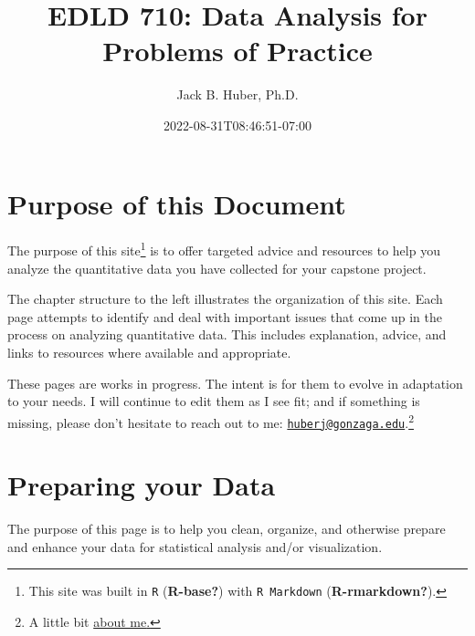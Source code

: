 \documentclass[
  letterpaper,
  DIV=11,
  numbers=noendperiod]{scrreprt}
\title{EDLD 710: Data Analysis for Problems of Practice}
\author{Jack B. Huber, Ph.D.}
\date{2022-08-31T08:46:51-07:00}
\renewcommand*\contentsname{Table of contents}
\newcommand\contentsname{Table of contents}
\begin{document}
\maketitle
\ifdefined\Shaded\renewenvironment{Shaded}{\begin{tcolorbox}[interior hidden, frame hidden, enhanced, sharp corners, borderline west={3pt}{0pt}{shadecolor}, boxrule=0pt, breakable]}{\end{tcolorbox}}\fi

\renewcommand*\contentsname{Table of contents}
{
\hypersetup{linkcolor=}
\setcounter{tocdepth}{2}
\tableofcontents
}

\hypertarget{purpose-of-this-document}{%
\chapter*{Purpose of this Document}\label{purpose-of-this-document}}

The purpose of this site\footnote{This site was built in \texttt{R}
  (\textbf{R-base?}) with \texttt{R\ Markdown} (\textbf{R-rmarkdown?}).}
is to offer targeted advice and resources to help you analyze the
quantitative data you have collected for your capstone project.

The chapter structure to the left illustrates the organization of this
site. Each page attempts to identify and deal with important issues that
come up in the process on analyzing quantitative data. This includes
explanation, advice, and links to resources where available and
appropriate.

These pages are works in progress. The intent is for them to evolve in
adaptation to your needs. I will continue to edit them as I see fit; and
if something is missing, please don't hesitate to reach out to me:
\href{mailto:huberj@gonzaga.edu}{\nolinkurl{huberj@gonzaga.edu}}.\footnote{A
  little bit \href{AboutMe.html}{about me}\href{Projects.html}{.}}


\hypertarget{preparing-your-data}{%
\chapter*{Preparing your Data}\label{preparing-your-data}}

The purpose of this page is to help you clean, organize, and otherwise
prepare and enhance your data for statistical analysis and/or
visualization.
\end{document}
